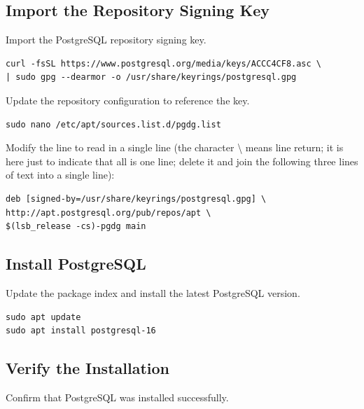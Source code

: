\subsection{Import the Repository Signing Key}
Import the PostgreSQL repository signing key.

\begin{lstlisting}[basicstyle=\footnotesize\ttfamily]
curl -fsSL https://www.postgresql.org/media/keys/ACCC4CF8.asc \
| sudo gpg --dearmor -o /usr/share/keyrings/postgresql.gpg
\end{lstlisting}

Update the repository configuration to reference the key.

\begin{lstlisting}[basicstyle=\footnotesize\ttfamily]
sudo nano /etc/apt/sources.list.d/pgdg.list
\end{lstlisting}

Modify the line to read in a single line (the character \textbackslash{}  means line return; it is here just to indicate that all is one line; delete it and join the following three lines of text into a single line):

\begin{lstlisting}[basicstyle=\footnotesize\ttfamily]
deb [signed-by=/usr/share/keyrings/postgresql.gpg] \
http://apt.postgresql.org/pub/repos/apt \
$(lsb_release -cs)-pgdg main
\end{lstlisting}

\subsection{Install PostgreSQL}
Update the package index and install the latest PostgreSQL version.

\begin{lstlisting}[basicstyle=\footnotesize\ttfamily]
sudo apt update
sudo apt install postgresql-16
\end{lstlisting}

\subsection{Verify the Installation}
Confirm that PostgreSQL was installed successfully.

